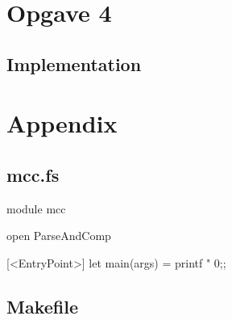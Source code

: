 \section{Opgave 4}
\subsection{Implementation}

\pagebreak
\section{Appendix}
\subsection{mcc.fs}
\begin{fs}
module mcc

open ParseAndComp

[<EntryPoint>]
let main(args) =
    printf "%
    0;;
\end{fs}
\subsection{Makefile}

